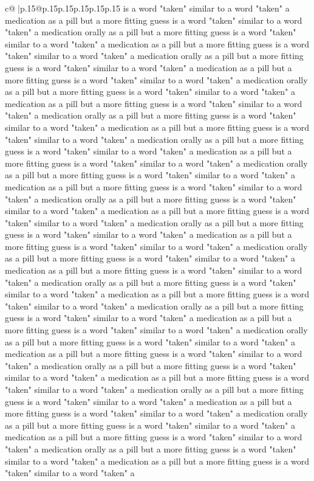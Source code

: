 \documentclass{article}
\begin{document}
{\begin{supertabular}{c@{$\;$}|p{.15\linewidth}@{}p{.15\linewidth}p{.15\linewidth}p{.15\linewidth}p{.15\linewidth}p{.15\linewidth}}
{{{is a word "taken" similar to a word "taken" a medication as a pill but a more fitting guess is a word "taken" similar to a word "taken" a medication orally as a pill but a more fitting guess is a word "taken" similar to a word "taken" a medication as a pill but a more fitting guess is a word "taken" similar to a word "taken" a medication orally as a pill but a more fitting guess is a word "taken" similar to a word "taken" a medication as a pill but a more fitting guess is a word "taken" similar to a word "taken" a medication orally as a pill but a more fitting guess is a word "taken" similar to a word "taken" a medication as a pill but a more fitting guess is a word "taken" similar to a word "taken" a medication orally as a pill but a more fitting guess is a word "taken" similar to a word "taken" a medication as a pill but a more fitting guess is a word "taken" similar to a word "taken" a medication orally as a pill but a more fitting guess is a word "taken" similar to a word "taken" a medication as a pill but a more fitting guess is a word "taken" similar to a word "taken" a medication orally as a pill but a more fitting guess is a word "taken" similar to a word "taken" a medication as a pill but a more fitting guess is a word "taken" similar to a word "taken" a medication orally as a pill but a more fitting guess is a word "taken" similar to a word "taken" a medication as a pill but a more fitting guess is a word "taken" similar to a word "taken" a medication orally as a pill but a more fitting guess is a word "taken" similar to a word "taken" a medication as a pill but a more fitting guess is a word "taken" similar to a word "taken" a medication orally as a pill but a more fitting guess is a word "taken" similar to a word "taken" a medication as a pill but a more fitting guess is a word "taken" similar to a word "taken" a medication orally as a pill but a more fitting guess is a word "taken" similar to a word "taken" a medication as a pill but a more fitting guess is a word "taken" similar to a word "taken" a medication orally as a pill but a more fitting guess is a word "taken" similar to a word "taken" a medication as a pill but a more fitting guess is a word "taken" similar to a word "taken" a medication orally as a pill but a more fitting guess is a word "taken" similar to a word "taken" a medication as a pill but a more fitting guess is a word "taken" similar to a word "taken" a medication orally as a pill but a more fitting guess is a word "taken" similar to a word "taken" a medication as a pill but a more fitting guess is a word "taken" similar to a word "taken" a medication orally as a pill but a more fitting guess is a word "taken" similar to a word "taken" a medication as a pill but a more fitting guess is a word "taken" similar to a word "taken" a medication orally as a pill but a more fitting guess is a word "taken" similar to a word "taken" a medication as a pill but a more fitting guess is a word "taken" similar to a word "taken" a medication orally as a pill but a more fitting guess is a word "taken" similar to a word "taken" a medication as a pill but a more fitting guess is a word "taken" similar to a word "taken" a }}}
\end{supertabular}}
\end{document}
